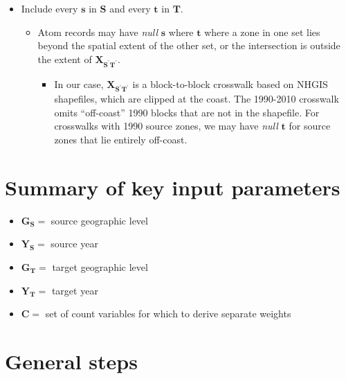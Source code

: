 \documentclass{article}
\begin{document}
\begin{itemize}
\begin{itemize}
    \end{itemize}
  \item Include every $\bm{s}$ in $\mathbf{S}$ and every $\bm{t}$ in $\mathbf{T}$.
    \begin{itemize}
    \item Atom records may have \textit{null} $\bm{s}$ where $\bm{t}$ where a zone in one set lies beyond the spatial extent of the other set, or the intersection is outside the extent of $\bm{X_{\mathbf{S^\prime T^\prime}}}$.
      \begin{itemize}
      \item In our case, $\bm{X_{\mathbf{S^\prime T^\prime}}}$ is a block-to-block crosswalk based on NHGIS shapefiles, which are clipped at the coast. The 1990-2010 crosswalk omits ``off-coast'' 1990 blocks that are not in the shapefile. For crosswalks with 1990 source zones, we may have \textit{null} $\bm{t}$ for source zones that lie entirely off-coast.
      \end{itemize}
    \end{itemize}
\end{itemize}

\section{Summary of key input parameters}
\begin{itemize}
  \item $\bm{G_{\mathbf{S}}} = $ source geographic level
  \item $\bm{Y_{\mathbf{S}}} = $ source year
  \item $\bm{G_{\mathbf{T}}} = $ target geographic level
  \item $\bm{Y_{\mathbf{T}}} = $ target year
  \item $\mathbf{C} = $ set of count variables for which to derive separate weights
\end{itemize}

\section{General steps}
\end{document}

